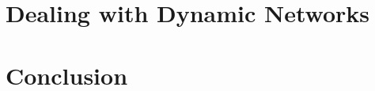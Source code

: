 \documentclass[a4paper,11pt]{article}
\begin{document}
\section{Dealing with Dynamic Networks}



\section{Conclusion}





{}


\end{document}
